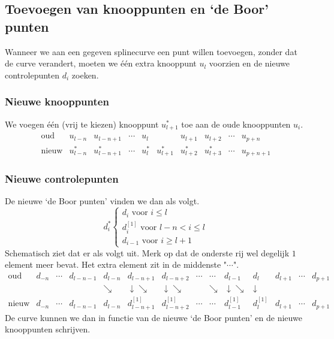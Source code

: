 \documentclass[computergesteund_ontwerp_van_curven_en_oppervlakken.tex]{subfiles}
\begin{document}
\subsection{Toevoegen van knooppunten en `de Boor' punten}
Wanneer we aan een gegeven splinecurve een punt willen toevoegen, zonder dat de curve verandert, moeten we \'e\'en extra knooppunt $u_l$ voorzien en de nieuwe controlepunten $d_i$ zoeken. 

\subsubsection*{Nieuwe knooppunten}
We voegen \'e\'en (vrij te kiezen) knooppunt $u_{l+1}^*$ toe aan de oude knooppunten $u_i$. 
\[
\begin{array}{c||c|c|c|c|c|c|c|c|c||}
\text{oud} & u_{l-n} & u_{l-n+1} & \cdots & u_l & & u_{l+1} & u_{l+2} & \cdots & u_{p+n}
\\
\text{nieuw} & u_{l-n}^* & u_{l-n+1}^* & \cdots & u_l^* & u_{l+1}^{*} & u_{l+2}^{*} & u_{l+3}^{*} & \cdots & u_{p+n+1}
\end{array}
\]

\subsubsection*{Nieuwe controlepunten}
De nieuwe `de Boor punten' vinden we dan als volgt.
\[
d_{i}^{*}
\left\{
\begin{array}{c}
d_{i} \text{ voor } i\le l\\
d_{i}^{[1]} \text{ voor } l-n< i\le l\\
d_{i-1} \text{ voor } i \ge l+1
\end{array}
\right.
\]
Schematisch ziet dat er als volgt uit. Merk op dat de onderste rij wel degelijk $1$ element meer bevat. Het extra element zit in de middenste "$\cdots$".
\[
\begin{array}{c||c|c|c|c|c|c|c|c|c|c|c|c|c||}
\text{oud} & d_{-n} & \cdots & d_{l-n-1} & d_{l-n} & d_{l-n+1} & d_{l-n+2} & \cdots & \cdots& d_{l-1} & d_{l} & d_{l+1} & \cdots & d_{p+1}
\\
&&&&\searrow&\downarrow\searrow&\downarrow\searrow & & \searrow & \downarrow\searrow & \downarrow&&&
\\
\text{nieuw} & d_{-n} & \cdots & d_{l-n-1} & d_{l-n}& d_{l-n+1}^{[1]} & d_{l-n+2}^{[1]} & \cdots & \cdots & d_{l-1}^{[1]} & d_{l}^{[1]} & d_{l+1} & \cdots& d_{p+1}
\end{array}
\]
De curve kunnen we dan in functie van de nieuwe `de Boor punten' en de nieuwe knooppunten schrijven.
\end{document}
